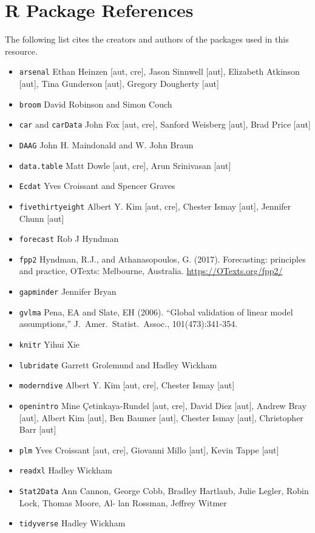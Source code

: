 \documentclass[
]{book}
\providecommand{\tightlist}{%
  \setlength{\itemsep}{0pt}\setlength{\parskip}{0pt}}
\begin{document}
\hypertarget{r-package-references}{%
\section*{R Package References}\label{r-package-references}}

The following list cites the creators and authors of the packages used in this resource.

\begin{itemize}
\tightlist
\item
  \texttt{arsenal} Ethan Heinzen {[}aut, cre{]}, Jason Sinnwell {[}aut{]}, Elizabeth Atkinson {[}aut{]}, Tina Gunderson {[}aut{]}, Gregory Dougherty {[}aut{]}
\item
  \texttt{broom} David Robinson and Simon Couch
\item
  \texttt{car} and \texttt{carData} John Fox {[}aut, cre{]}, Sanford Weisberg {[}aut{]}, Brad Price {[}aut{]}
\item
  \texttt{DAAG} John H. Maindonald and W. John Braun
\item
  \texttt{data.table} Matt Dowle {[}aut, cre{]}, Arun Srinivasan {[}aut{]}
\item
  \texttt{Ecdat} Yves Croissant and Spencer Graves
\item
  \texttt{fivethirtyeight} Albert Y. Kim {[}aut, cre{]}, Chester Ismay {[}aut{]}, Jennifer Chunn {[}aut{]}
\item
  \texttt{forecast} Rob J Hyndman
\item
  \texttt{fpp2} Hyndman, R.J., and Athanasopoulos, G. (2017). Forecasting: principles and practice, OTexts: Melbourne, Australia. \url{https://OTexts.org/fpp2/}
\item
  \texttt{gapminder} Jennifer Bryan
\item
  \texttt{gvlma} Pena, EA and Slate, EH (2006). ``Global validation of linear model assumptions,'' J.~Amer.~Statist.~Assoc., 101(473):341-354.
\item
  \texttt{knitr} Yihui Xie
\item
  \texttt{lubridate} Garrett Grolemund and Hadley Wickham
\item
  \texttt{moderndive} Albert Y. Kim {[}aut, cre{]}, Chester Ismay {[}aut{]}
\item
  \texttt{openintro} Mine Çetinkaya-Rundel {[}aut, cre{]}, David Diez {[}aut{]}, Andrew Bray {[}aut{]}, Albert Kim {[}aut{]}, Ben Baumer {[}aut{]}, Chester Ismay {[}aut{]}, Christopher Barr {[}aut{]}
\item
  \texttt{plm} Yves Croissant {[}aut, cre{]}, Giovanni Millo {[}aut{]}, Kevin Tappe {[}aut{]}
\item
  \texttt{readxl} Hadley Wickham
\item
  \texttt{Stat2Data} Ann Cannon, George Cobb, Bradley Hartlaub, Julie Legler, Robin Lock, Thomas Moore, Al- lan Rossman, Jeffrey Witmer
\item
  \texttt{tidyverse} Hadley Wickham
\end{itemize}
\end{document}
